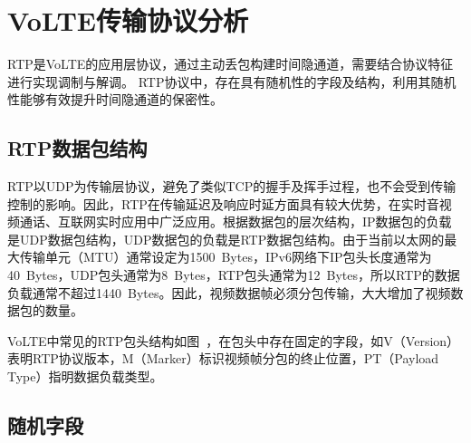 \section{VoLTE传输协议分析}
\label{chap:backinfo:rtp}

RTP是VoLTE的应用层协议，通过主动丢包构建时间隐通道，需要结合协议特征进行实现调制与解调。
RTP协议中，存在具有随机性的字段及结构，利用其随机性能够有效提升时间隐通道的保密性。

\subsection{RTP数据包结构}
\label{chap:backinfo:rtp:struct}

RTP以UDP为传输层协议，避免了类似TCP的握手及挥手过程，也不会受到传输控制的影响。因此，RTP在传输延迟及响应时延方面具有较大优势，在实时音视频通话、互联网实时应用中广泛应用。根据数据包的层次结构，IP数据包的负载是UDP数据包结构，UDP数据包的负载是RTP数据包结构。由于当前以太网的最大传输单元（MTU）通常设定为{1500\ Bytes}，IPv6网络下IP包头长度通常为{40\ Bytes}，UDP包头通常为{8\ Bytes}，RTP包头通常为{12\ Bytes}，所以RTP的数据负载通常不超过{1440\ Bytes}。因此，视频数据帧必须分包传输，大大增加了视频数据包的数量。


VoLTE中常见的RTP包头结构如图\ ，在包头中存在固定的字段，如V（{Version}）表明RTP协议版本，M（{Marker}）标识视频帧分包的终止位置，PT（{Payload Type}）指明数据负载类型。

\subsection{随机字段}
\label{chap:backinfo:rtp:random}

